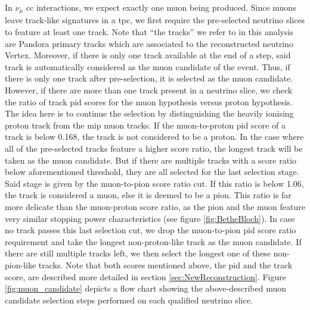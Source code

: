 In $\nu_{\mu}$ \gls{cc} interactions, we expect exactly one muon being produced. Since muons leave track-like signatures in a \gls{tpc}, we first require the pre-selected neutrino slices to feature at least one track. Note that ``the tracks'' we refer to in this analysis are \gls{Pandora} primary tracks which are associated to the reconstructed neutrino \gls{Vertex}. Moreover, if there is only one track available at the end of a step, said track is automatically considered as the muon candidate of the event. Thus, if there is only one track after pre-selection, it is selected as the muon candidate. However, if there are more than one track present in a neutrino slice, we check the ratio of track \gls{pid} scores for the muon hypothesis versus proton hypothesis. The idea here is to continue the selection by distinguishing the heavily ionising proton track from the \gls{mip} muon tracks. If the muon-to-proton \gls{pid} score of a track is below \num{0.168}, the track is not considered to be a proton. In the case where all of the pre-selected tracks feature a higher score ratio, the longest track will be taken as the muon candidate. But if there are multiple tracks with a score ratio below aforementioned threshold, they are all selected for the last selection stage. Said stage is given by the muon-to-pion score ratio cut. If this ratio is below \num{1.06}, the track is considered a muon, else it is deemed to be a pion. This ratio is far more delicate than the muon-proton score ratio, as the pion and the muon feature very similar stopping power characteristics (see figure \ref{fig:BetheBloch}). In case no track passes this last selection cut, we drop the muon-to-pion \gls{pid} score ratio requirement and take the longest non-proton-like track as the muon candidate. If there are still multiple tracks left, we then select the longest one of these non-pion-like tracks. Note that both scores mentioned above, the \gls{pid} and the track score, are described more detailed in section \ref{sec:NewReconstruction}. Figure \ref{fig:muon_candidate} depicts a flow chart showing the above-described muon candidate selection steps performed on each qualified neutrino slice.
